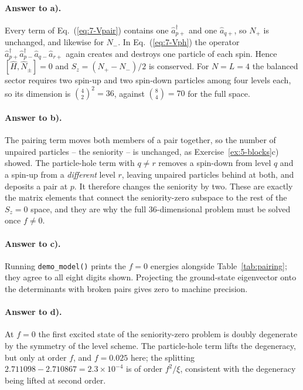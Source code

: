 \paragraph{Answer to a).}
Every term of Eq.~(\ref{eq:7-Vpair}) contains one $\hat{a}^{\dagger}_{p+}$ and
one $\hat{a}_{q+}$, so $N_+$ is unchanged, and likewise for $N_-$.  In
Eq.~(\ref{eq:7-Vph}) the operator
$\hat{a}^{\dagger}_{p+}\hat{a}^{\dagger}_{p-}\hat{a}_{q-}\hat{a}_{r+}$ again
creates and destroys one particle of each spin.  Hence
$[\hat{H},\hat{N}_{\pm}]=0$ and $S_z=(N_+-N_-)/2$ is conserved.  For $N=L=4$
the balanced sector requires two spin-up and two spin-down particles among
four levels each, so its dimension is $\binom{4}{2}^2=36$, against
$\binom{8}{4}=70$ for the full space.

\paragraph{Answer to b).}
The pairing term moves both members of a pair together, so the number of
unpaired particles -- the seniority -- is unchanged, as
Exercise~\ref{ex:5-blocks}c) showed.  The particle-hole term with $q\ne r$
removes a spin-down from level $q$ and a spin-up from a \emph{different}
level $r$, leaving unpaired particles behind at both, and deposits a pair at
$p$.  It therefore changes the seniority by two.  These are exactly the matrix
elements that connect the seniority-zero subspace to the rest of the $S_z=0$
space, and they are why the full $36$-dimensional problem must be solved once
$f\ne0$.

\paragraph{Answer to c).}
Running \texttt{demo\_model()} prints the $f=0$ energies alongside
Table~\ref{tab:pairing}; they agree to all eight digits shown.  Projecting the
ground-state eigenvector onto the determinants with broken pairs gives zero to
machine precision.

\paragraph{Answer to d).}
At $f=0$ the first excited state of the seniority-zero problem is doubly
degenerate by the symmetry of the level scheme.  The particle-hole term lifts
the degeneracy, but only at order $f$, and $f=0.025$ here; the splitting
$2.711098-2.710867=2.3\times10^{-4}$ is of order $f^2/\xi$, consistent with
the degeneracy being lifted at second order.

